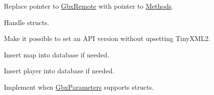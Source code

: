 
\begin{DoxyRefList}
\item[\label{todo__todo000001}%
\hypertarget{todo__todo000001}{}%
Member \hyperlink{classCallBackManager_aecf87c2156353eb95b8ca85bebde8b71}{Call\-Back\-Manager\-:\-:Call\-Back\-Manager} (\hyperlink{classGbxRemote}{Gbx\-Remote} $\ast$server\-Ptr, \hyperlink{classCommandManager}{Command\-Manager} $\ast$command\-Manager\-Ptr, \hyperlink{classEventManager}{Event\-Manager} $\ast$event\-Manager\-Ptr, sql\-::\-Connection $\ast$database\-Ptr, std\-::map$<$ std\-::string, Player $>$ $\ast$player\-List, \hyperlink{classMapList}{Map\-List} $\ast$map\-List)]Replace pointer to \hyperlink{classGbxRemote}{Gbx\-Remote} with pointer to \hyperlink{classMethods}{Methods}. 
\item[\label{todo__todo000003}%
\hypertarget{todo__todo000003}{}%
Class \hyperlink{classGbxParameter}{Gbx\-Parameter} ]Handle structs.  
\item[\label{todo__todo000002}%
\hypertarget{todo__todo000002}{}%
Class \hyperlink{classGbxRemote}{Gbx\-Remote} ]Make it possible to set an A\-P\-I version without upsetting Tiny\-X\-M\-L2.  
\item[\label{todo__todo000005}%
\hypertarget{todo__todo000005}{}%
Member \hyperlink{classManiaPP_a18582fa28b259c22a8a8d526af62123a}{Mania\-P\-P\-:\-:retrieve\-Map\-List} ()]Insert map into database if needed.  
\item[\label{todo__todo000004}%
\hypertarget{todo__todo000004}{}%
Member \hyperlink{classManiaPP_aede94c0b982250de19186d447542e479}{Mania\-P\-P\-:\-:retrieve\-Player\-List} ()]Insert player into database if needed.  
\item[\label{todo__todo000006}%
\hypertarget{todo__todo000006}{}%
Member \hyperlink{classMethods_a0572ff430bc8be89035033fe17d8486a}{Methods\-:\-:Set\-Call\-Vote\-Ratios\-Ex} (bool replace\-All, std\-::vector$<$ Extended\-Call\-Vote\-Ratio $>$ ratios)]Implement when \hyperlink{classGbxParameters}{Gbx\-Parameters} supports structs. 
\end{DoxyRefList}